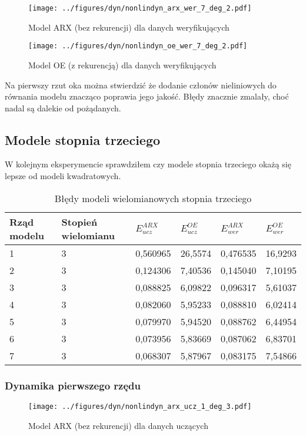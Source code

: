 \documentclass[a4paper,titlepage,11pt,floatssmall]{mwrep}
\begin{document}
\begin{figure}[H]
\centering
\texttt{[image: ../figures/dyn/nonlindyn\_arx\_wer\_7\_deg\_2.pdf]}
\caption{Model ARX (bez rekurencji) dla danych weryfikujących}
\end{figure}

\begin{figure}[H]
\centering
\texttt{[image: ../figures/dyn/nonlindyn\_oe\_wer\_7\_deg\_2.pdf]}
\caption{Model OE (z rekurencją) dla danych weryfikujących}
\end{figure}

Na pierwszy rzut oka można stwierdzić że dodanie członów nieliniowych do równania modelu znacząco poprawia jego jakość. Błędy znacznie zmalały, choć nadal są dalekie od pożądanych. 

\subsection{Modele stopnia trzeciego}
W kolejnym eksperymencie sprawdziłem czy modele stopnia trzeciego okażą się lepsze od modeli kwadratowych.

\begin{table}[H]
\centering
\caption{Błędy modeli wielomianowych stopnia trzeciego}
\begin{tabular}{|l|l|l|l|l|l|}
\hline
Rząd modelu & Stopień wielomianu & $E_{ucz}^{ARX}$    & $E_{ucz}^{OE}$   & $E_{wer}^{ARX}$    & $E_{wer}^{OE}$   \\ \hline
1           & 3                  & 0,560965 & 26,5574 & 0,476535 & 16,9293 \\ \hline
2           & 3                  & 0,124306 & 7,40536 & 0,145040 & 7,10195 \\ \hline
3           & 3                  & 0,088825 & 6,09822 & 0,096317 & 5,61037 \\ \hline
4           & 3                  & 0,082060 & 5,95233 & 0,088810 & 6,02414 \\ \hline
5           & 3                  & 0,079970 & 5,94520 & 0,088762 & 6,44954 \\ \hline
6           & 3                  & 0,073956 & 5,83669 & 0,087062 & 6,83701 \\ \hline
7           & 3                  & 0,068307 & 5,87967 & 0,083175 & 7,54866 \\ \hline
\end{tabular}
\end{table}

\newpage
\subsubsection{Dynamika pierwszego rzędu}
\begin{figure}[H]
\centering
\texttt{[image: ../figures/dyn/nonlindyn\_arx\_ucz\_1\_deg\_3.pdf]}
\caption{Model ARX (bez rekurencji) dla danych uczących}
\end{figure}
\end{document}
